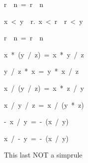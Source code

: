 \begin{isabelle}
\begin{isamarkuptext}
\begin{isabelle}
\isasymbar r\isasymbar \ \isacharcircum \ n\ =\ \isasymbar r\ \isacharcircum \ n\isasymbar 
{}
\end{isabelle}

\begin{isabelle}
x\ <\ y\ \isasymLongrightarrow \ \isasymexists r.\ x\ <\ r\ \isasymand \ r\ <\ y%
\end{isabelle}

\begin{isabelle}
\isasymbar r\isasymbar \ \isacharcircum \ n\ =\ \isasymbar r\ \isacharcircum \ n\isasymbar 
{}
\end{isabelle}

\begin{isabelle}
x\ *\ (y\ /\ z)\ =\ x\ *\ y\ /\ z%
\end{isabelle}

\begin{isabelle}
y\ /\ z\ *\ x\ =\ y\ *\ x\ /\ z%
\end{isabelle}

\begin{isabelle}
x\ /\ (y\ /\ z)\ =\ x\ *\ z\ /\ y%
\end{isabelle}

\begin{isabelle}
x\ /\ y\ /\ z\ =\ x\ /\ (y\ *\ z)
\end{isabelle}

\begin{isabelle}
-\ x\ /\ y\ =\ -\ (x\ /\ y)
\end{isabelle}

\begin{isabelle}
x\ /\ -\ y\ =\ -\ (x\ /\ y)
\end{isabelle}

This last NOT a simprule


\end{isamarkuptext}
\end{isabelle}

